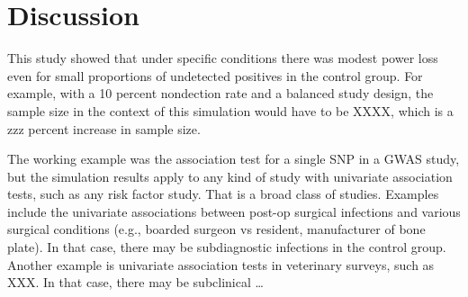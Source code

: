 \documentclass[
]{article}
\begin{document}
\endgroup{}

\pagebreak

\hypertarget{discussion}{%
\section{Discussion}\label{discussion}}

This study showed that under specific conditions there was modest power
loss even for small proportions of undetected positives in the control
group. For example, with a 10 percent nondection rate and a balanced
study design, the sample size in the context of this simulation would
have to be XXXX, which is a zzz percent increase in sample size.

The working example was the association test for a single SNP in a GWAS
study, but the simulation results apply to any kind of study with
univariate association tests, such as any risk factor study. That is a
broad class of studies. Examples include the univariate associations
between post-op surgical infections and various surgical conditions
(e.g., boarded surgeon vs resident, manufacturer of bone plate). In that
case, there may be subdiagnostic infections in the control group.
Another example is univariate association tests in veterinary surveys,
such as XXX. In that case, there may be subclinical \ldots{}
\end{document}
